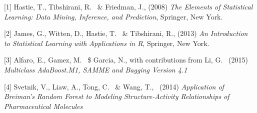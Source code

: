 \documentclass{article}
\begin{document}
\small

[1] Hastie, T., Tibshirani, R. \ \& Friedman, J., (2008) {\it The Elements of Statistical Learning: Data Mining, Inference, and Prediction}, Springer, New York.

[2] James, G., Witten, D., Hastie, T. \ \& Tibshirani, R., (2013) {\it An Introduction to Statistical Learning
with Applications in R}, Springer, New York.

[3] Alfaro, E., Gamez, M. \ \$ Garcia, N., with contributions from Li, G. \ (2015) {\it Multiclass AdaBoost.M1, SAMME and Bagging Version 4.1}

[4] Svetnik, V., Liaw, A., Tong, C. \ \& Wang, T., \ (2014) {\it Application of Breiman’s Random Forest to Modeling  Structure-Activity  Relationships  of  Pharmaceutical  Molecules}
\end{document}
